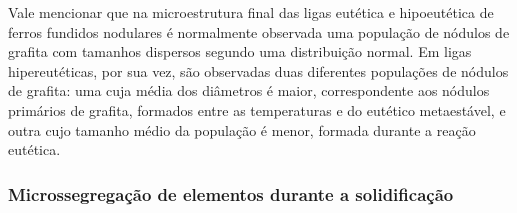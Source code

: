 



Vale mencionar que na microestrutura final das ligas eutética e hipoeutética de ferros fundidos nodulares é normalmente observada uma população de nódulos de grafita com tamanhos dispersos segundo uma distribuição normal. Em ligas hipereutéticas, por sua vez, são observadas duas diferentes populações de nódulos de grafita: uma cuja média dos diâmetros é maior, correspondente aos nódulos primários de grafita, formados entre as temperaturas  e do eutético metaestável, e outra cujo tamanho médio da população é menor, formada durante a reação eutética\cite{Santos1989}. %


\subsubsection{Microssegregação de elementos durante a solidificação}

